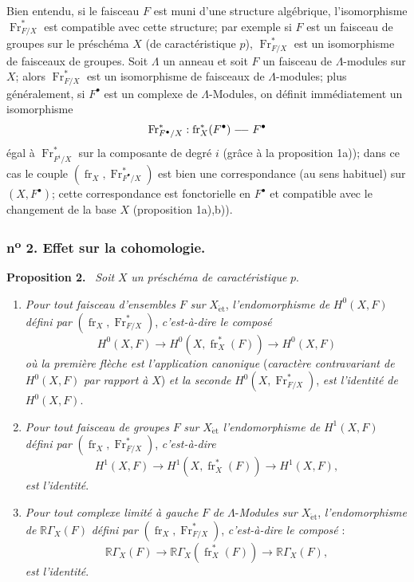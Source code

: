 \documentclass[11pt]{article}
\newenvironment{statement}[1]{\par\medskip\noindent\textbf{#1.}\ }{\par\medskip}
\newcommand{\R}{\mathbb{R}}\newcommand{\RHomCore}{\mathbb{R}\mathrm{Hom}}
\providecommand{\et}{\mathrm{\acute{e}t}}
\providecommand{\RGamma}{\R\Gamma}
\providecommand{\RGamma}{\R\Gamma}
\providecommand{\R}{\mathrm R}
\providecommand{\fr}{\operatorname{fr}}
\providecommand{\Fr}{\operatorname{Fr}}
\providecommand{\Fr}{\operatorname{Fr}}
\providecommand{\fr}{\operatorname{fr}}
\providecommand{\RGamma}{\R\Gamma}
\providecommand{\et}{\acute{e}t}
\begin{document}
Bien entendu, si le faisceau $F$ est muni d'une structure algébrique, l'isomorphisme $\Fr^*_{F/X}$ est compatible avec cette structure; par exemple si $F$ est un faisceau de groupes sur le préschéma $X$ (de caractéristique $p$), $\Fr^*_{F/X}$ est un isomorphisme de faisceaux de groupes. Soit $\Lambda$ un anneau et soit $F$ un faisceau de $\Lambda$-modules sur $X$; alors $\operatorname{Fr}^*_{F/X}$ est un isomorphisme de faisceaux de $\Lambda$-modules; plus généralement, si $F^\bullet$ est un complexe de $\Lambda$-Modules, on définit immédiatement un isomorphisme
\[
\Fr^*_{F^\bullet/X}:\fr_X^*(F^\bullet)\relbar\joinrel\relbar F^\bullet
\]
égal à $\Fr^*_{F^i/X}$ sur la composante de degré $i$ (grâce à la proposition 1a)); dans ce cas le couple $(\fr_X,\Fr^*_{F^\bullet/X})$ est bien une correspondance (au sens habituel) sur $(X,F^\bullet)$; cette correspondance est fonctorielle en $F^\bullet$ et compatible avec le changement de la base $X$ (proposition 1a),b)).

\subsubsection*{n\textsuperscript{o} 2. Effet sur la cohomologie.}

\begin{statement}{Proposition 2}
\emph{Soit} $X$ \emph{un préschéma de caractéristique} $p$.
\begin{enumerate}[label=\alph*)]
\item \emph{Pour tout faisceau d'ensembles} $F$ \emph{sur} $X_{\et}$, \emph{l'endomorphisme de} $H^0(X,F)$ \emph{défini par} $(\fr_X,\Fr^*_{F/X})$, \emph{c'est-à-dire le composé}
\[
H^0(X,F)\longrightarrow H^0(X,\fr_X^*(F))\longrightarrow H^0(X,F)
\]
\emph{où la première flèche est l'application canonique} (\emph{caractère contravariant de} $H^0(X,F)$ \emph{par rapport à} $X$) \emph{et la seconde} $H^0(X,\Fr^*_{F/X})$, \emph{est l'identité de} $H^0(X,F)$.
\item
\emph{Pour tout faisceau de groupes} $F$ \emph{sur} $X_{\et}$ \emph{l'endomorphisme de} $H^1(X,F)$ \emph{défini par} $(\fr_X,\Fr^*_{F/X})$, \emph{c'est-à-dire}
\[
H^1(X,F)\longrightarrow H^1(X,\fr_X^*(F))\longrightarrow H^1(X,F),
\]
\emph{est l'identité}.
\item \emph{Pour tout complexe limité à gauche} $F$ \emph{de} $\Lambda$-\emph{Modules sur} $X_{\et}$, \emph{l'endomorphisme de} $\RGamma_X(F)$ \emph{défini par} $(\fr_X,\Fr^*_{F/X})$, \emph{c'est-à-dire le composé} :
\[
\RGamma_X(F)\longrightarrow \RGamma_X(\fr_X^*(F))\longrightarrow \RGamma_X(F),
\]
\emph{est l'identité}.
\end{enumerate}
\end{statement}
\end{document}
